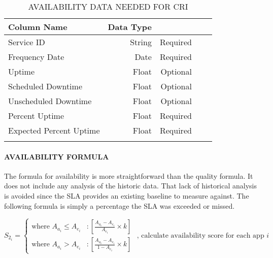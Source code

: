 \documentclass[SDSUThesis.tex]{subfiles}
\begin{document}
            
                \begin{longtable}{@{}l rr rr}
                    \toprule%
                     \centering%
                     {\bfseries Column Name}
                     & {\bfseries Data Type}
                     &  \\
                    
                    \cmidrule[0.4pt](r{0.125em}){1-1}%
                    \cmidrule[0.4pt](lr{0.125em}){2-2}%
                    \cmidrule[0.4pt](l{0.125em}){3-3}%
                    \endhead
                    
                    Service ID & String  & Required \\
                    \myrowcolour%
                    Frequency Date & Date & Required \\
                    Uptime & Float & Optional \\
                    \myrowcolour%
                    Scheduled Downtime & Float & Optional \\
                    Unscheduled Downtime & Float  & Optional \\
                    \myrowcolour%
                    Percent Uptime & Float & Required \\
                    Expected Percent Uptime & Float & Required \\
                    
                    \bottomrule
                    
                    \caption{AVAILABILITY DATA NEEDED FOR CRI}
                    \label{tab:availdata}
                \end{longtable}
            
            \paragraph{AVAILABILITY FORMULA}
                The formula for availability is more straightforward than the quality formula.
                It does not include any analysis of the historic data.  That lack of historical
                analysis is avoided since the SLA provides an existing baseline to measure 
                against.  The following formula is simply a percentage the SLA was exceeded
                or missed. 
                
                \begin{displaymath}
                   S_{2_i} = \left\{
                     \begin{array}{lr}
                       \text{where } A_{a_i} \leq A_{e_i} & : \left[ \frac{A_{a_i} - A_{e_i}}{A_{e_i}}\times k \right] \\
                       \text{where } A_{a_i} > A_{e_i}  & : \left[ \frac{A_{a_i} - A_{e_i} }{1-A_{e_i}}\times k \right]
                     \end{array}
                   \right. \text{   , calculate availability score for each app $i$}
                \end{displaymath}
                
\end{document}
